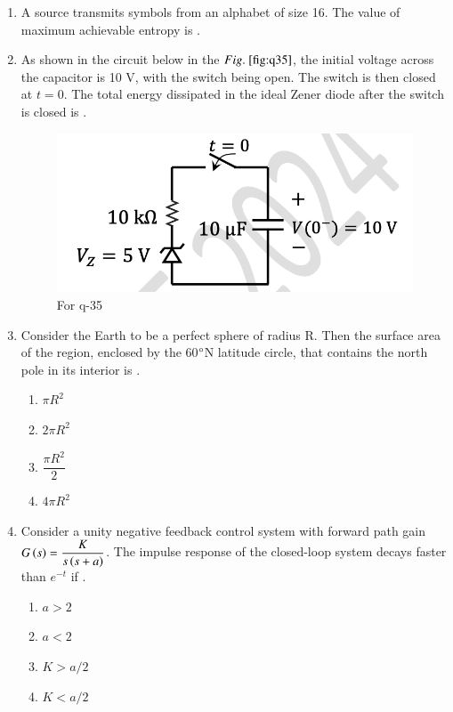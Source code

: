 \documentclass[journal,12pt,onecolumn]{IEEEtran}
\theoremstyle{remark}
\begin{document}
\begin{enumerate}
\item A source transmits symbols from an alphabet of size 16. The value of maximum achievable entropy  is \underline{\hspace{2cm}}.
\hfill{}

\item As shown in the circuit below in the $\figref{fig:q35}$, the initial voltage across the capacitor is 10 V, with the switch being open. The switch is then closed at $t = 0$. The total energy dissipated in the ideal Zener diode  after the switch is closed  is \underline{\hspace{2cm}}.
\begin{figure}[H]
    \centering
    \includegraphics[width=0.5\columnwidth]{q35.png}
    \caption{For q-35}
    \label{fig:q35}
\end{figure}
\hfill{}

\item Consider the Earth to be a perfect sphere of radius R. Then the surface area of the region, enclosed by the 60$\degree$N latitude circle, that contains the north pole in its interior is \underline{\hspace{2cm}}.

\hfill{}
\begin{multicols}{4}
    \begin{enumerate}
    \item $\pi R^2$
    \item $2\pi R^2$
    \item $\dfrac{\pi R^2}{2}$
    \item $4\pi R^2$
\end{enumerate}
\end{multicols}


\item Consider a unity negative feedback control system with forward path gain $G\left(s\right) = \dfrac{K}{s\left(s+a\right)}$. The impulse response of the closed-loop system decays faster than $e^{-t}$ if \underline{\hspace{2cm}}.
\hfill{}
\begin{multicols}{4}
    \begin{enumerate}
    \item $a > 2$
    \item $a < 2$
    \item $K > a/2$
    \item $K < a/2$
\end{enumerate}
\end{multicols}



\end{enumerate}
\end{document}
